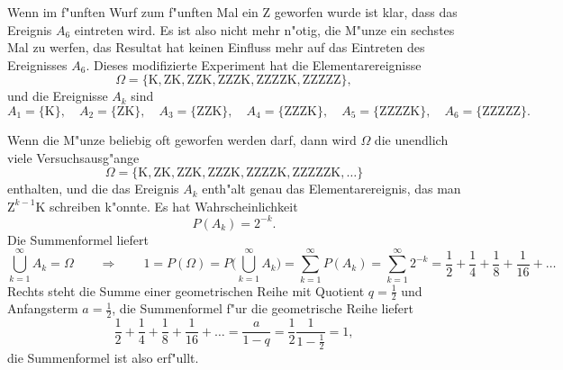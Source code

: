 \begin{loesung}
\begin{teilaufgaben}
Wenn im f"unften Wurf zum f"unften Mal ein Z geworfen wurde ist klar,
dass das Ereignis $A_6$ eintreten wird.
Es ist also nicht mehr n"otig, die M"unze ein sechstes Mal zu werfen, 
das Resultat hat keinen Einfluss mehr auf das Eintreten des Ereignisses
$A_6$.
Dieses modifizierte Experiment hat die Elementarereignisse
\[
\Omega = \{
\text{K},
\text{ZK},
\text{ZZK},
\text{ZZZK},
\text{ZZZZK},
\text{ZZZZZ}
\},
\]
und die Ereignisse $A_k$ sind
\[
A_1=\{\text{K}\},\quad
A_2=\{\text{ZK}\},\quad
A_3=\{\text{ZZK}\},\quad
A_4=\{\text{ZZZK}\},\quad
A_5=\{\text{ZZZZK}\},\quad
A_6=\{\text{ZZZZZ}\}.
\]
\item
Wenn die M"unze beliebig oft geworfen werden darf, dann wird $\Omega$ die unendlich
viele Versuchsausg"ange
\[
\Omega = \{
\text{K},
\text{ZK},
\text{ZZK},
\text{ZZZK},
\text{ZZZZK},
\text{ZZZZZK},
\dots
\}
\]
enthalten, und die das Ereignis $A_k$ enth"alt genau das Elementarereignis,
das man $\text{Z}^{k-1}\text{K}$ schreiben k"onnte.
Es hat Wahrscheinlichkeit
\[
P(A_k)=2^{-k}.
\]
Die Summenformel liefert
\[
\bigcup_{k=1}^\infty A_k=\Omega
\qquad\Rightarrow\qquad
1=P(\Omega)=P\biggl(
\bigcup_{k=1}^\infty A_k
\biggr)
=\sum_{k=1}^\infty P(A_k)=\sum_{k=1}^\infty 2^{-k}=
\frac12+\frac14+\frac18+\frac1{16}+\dots
\]
Rechts steht die Summe einer geometrischen Reihe mit Quotient $q=\frac12$ und
Anfangsterm $a=\frac12$, die Summenformel f"ur die geometrische Reihe liefert
\[
\frac12+\frac14+\frac18+\frac1{16}+\dots=\frac{a}{1-q}=\frac12\frac1{1-\frac12}=1,
\]
die Summenformel ist also erf"ullt.
\qedhere
\end{teilaufgaben}
\end{loesung}

